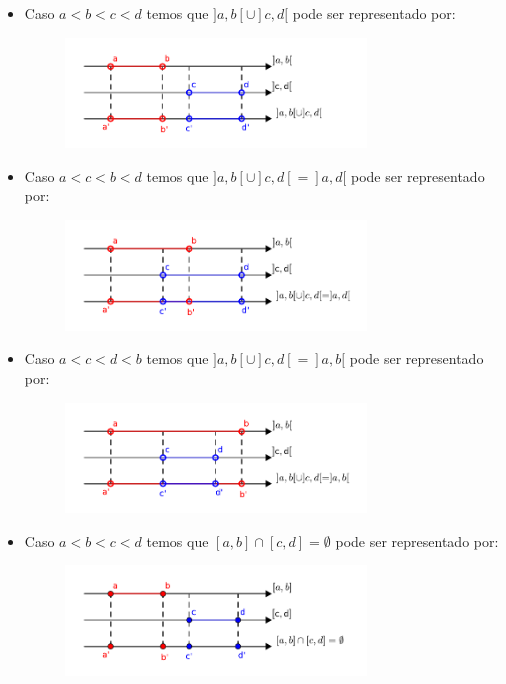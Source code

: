 \begin{itemize}
 \item Caso $a< b< c< d$ temos que $]a, b[ \cup ]c, d[$ pode ser representado por:
  \begin{figure}[H]
 \centering
 \includegraphics[width=8cm]{../Topicos/Figuras/uniao-a-b-c-d.pdf}
 \end{figure}
 
 \item Caso $a< c< b< d$ temos que $]a, b[ \cup ]c, d[= ]a, d[$ pode ser representado por:
  \begin{figure}[H]
 \centering
 \includegraphics[width=8cm]{../Topicos/Figuras/uniao-acb-d.pdf}
 \end{figure}
 
   \item Caso $a< c< d< b$ temos que $]a, b[ \cup ]c, d[= ]a, b[$ pode ser representado por:
  \begin{figure}[H]
 \centering
 \includegraphics[width=8cm]{../Topicos/Figuras/uniao-acd-b.pdf}
 \end{figure}
 
 \item Caso $a< b< c< d$ temos que $[a, b] \cap [c, d]= \emptyset$ pode ser representado por:
  \begin{figure}[H]
 \centering
 \includegraphics[width=8cm]{../Topicos/Figuras/intersecaoabcd.pdf}
 \end{figure}
 

\end{itemize}
